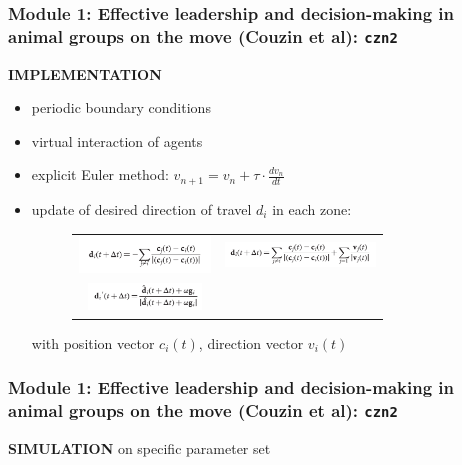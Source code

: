 \documentclass[compress]{beamer}
\begin{document}
\begin{frame}
	\frametitle{Module 1: Effective leadership and decision-making in animal groups on the move (Couzin et al): \texttt{czn2}}
	
	\textbf{IMPLEMENTATION} 
	
	\hspace{1cm}
	
	\begin{itemize}
		\item periodic boundary conditions
		\item virtual interaction of agents
		\item explicit Euler method: \( v_{n+1}= v_{n} + \tau \cdot \frac{dv_{n}}{dt}  \)
		\item update of desired direction of travel \( d_{i} \) in each zone: \\
		\begin{figure}
			\begin{tabular}{cc}
				\includegraphics[width=35mm]{./img/eq1.png} &   \includegraphics[width=40mm]{./img/eq2.png} \\
				\includegraphics[width=30mm]{./img/eq3.png} \\
			\end{tabular}
		\end{figure}
		with position vector \( c_{i}(t) \), direction vector \( v_{i}(t) \)%
	\end{itemize}
	
	
\end{frame}


\begin{frame}
	\frametitle{Module 1: Effective leadership and decision-making in animal groups on the move (Couzin et al): \texttt{czn2}}
	
	\textbf{SIMULATION} on specific parameter set 
	
	
\end{frame}
\end{document}
